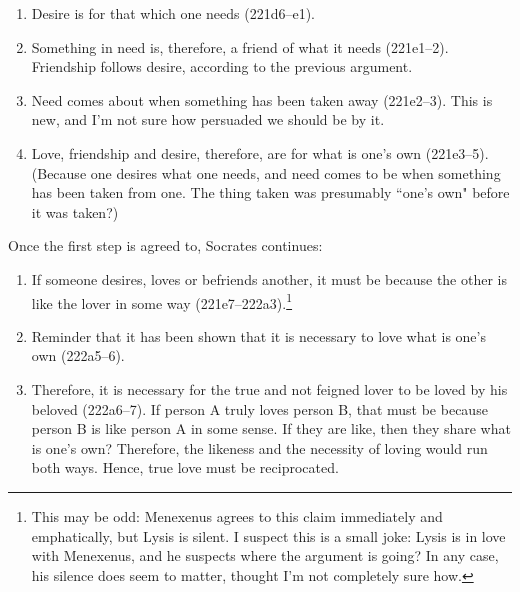 \documentclass[11pt]{article}
\begin{document}
\begin{enumerate}

    \item Desire is for that which one needs (221d6--e1).

    \item Something in need is, therefore, a friend of what it needs
        (221e1--2).  Friendship follows desire, according to the previous
        argument.

    \item Need comes about when something has been taken away (221e2--3).
        This is new, and I'm not sure how persuaded we should be by it.

    \item Love, friendship and desire, therefore, are for what is one's own
        (221e3--5).  (Because one desires what one needs, and need comes to
        be when something has been taken from one.  The thing taken was
        presumably ``one's own" before it was taken?)

\end{enumerate}

Once the first step is agreed to, Socrates continues:

\begin{enumerate}

    \item If someone desires, loves or befriends another, it must be
        because the other is like the lover in some way
        (221e7--222a3).\footnote{This may be odd: Menexenus agrees to this
        claim immediately and emphatically, but Lysis is silent.  I suspect
        this is a small joke: Lysis is in love with Menexenus, and he
        suspects where the argument is going?  In any case, his silence does
        seem to matter, thought I'm not completely sure how.}

    \item Reminder that it has been shown that it is necessary to love what
        is one's own (222a5--6).

    \item Therefore, it is necessary for the true and not feigned lover to
        be loved by his beloved (222a6--7).  If person A truly loves person
        B, that must be because person B is like person A in some sense.
        If they are like, then they share what is one's own?  Therefore,
        the likeness and the necessity of loving would run both ways.
        Hence, true love must be reciprocated.

\end{enumerate}
\end{document}
